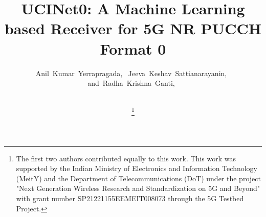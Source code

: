 \documentclass[journal]{IEEEtran}
\begin{document}
%
\title{UCINet0: A Machine Learning based Receiver for 5G NR PUCCH Format 0}
%
%
%



\author{Anil~Kumar~Yerrapragada,~
        Jeeva~Keshav~Sattianarayanin,~
        and~Radha~Krishna~Ganti,~%

}
\author{\\
\thanks{The first two authors contributed equally to this work. This work was supported by the Indian Ministry of Electronics and Information Technology (MeitY) and the Department of Telecommunications (DoT) under the project "Next Generation Wireless Research and Standardization on 5G and Beyond" with grant number SP21221155EEMEIT008073 through the 5G Testbed Project.}
}
\end{document}
